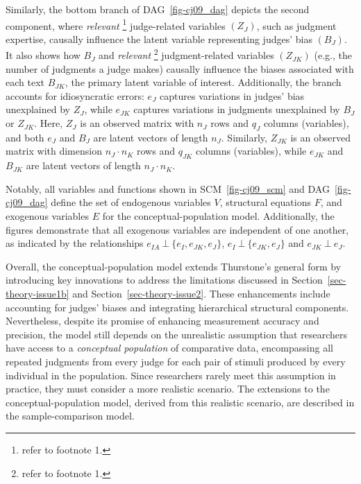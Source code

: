 \documentclass[
  authoryear,
  review,
  1p]{elsarticle}
\begin{document}
Similarly, the bottom branch of DAG~\ref{fig-cj09_dag} depicts the
second component, where \emph{relevant} \footnote{refer to footnote 1.}
judge-related variables \((Z_{J})\), such as judgment expertise,
causally influence the latent variable representing judges' bias
\((B_{J})\). It also shows how \(B_{J}\) and \emph{relevant} \footnote{refer
  to footnote 1.} judgment-related variables \((Z_{JK})\) (e.g., the
number of judgments a judge makes) causally influence the biases
associated with each text \(B_{JK}\), the primary latent variable of
interest. Additionally, the branch accounts for idiosyncratic errors:
\(e_{J}\) captures variations in judges' bias unexplained by \(Z_{J}\),
while \(e_{JK}\) captures variations in judgments unexplained by
\(B_{J}\) or \(Z_{JK}\). Here, \(Z_{J}\) is an observed matrix with
\(n_{J}\) rows and \(q_{J}\) columns (variables), and both \(e_{J}\) and
\(B_{J}\) are latent vectors of length \(n_{J}\). Similarly, \(Z_{JK}\)
is an observed matrix with dimension \(n_{J} \cdot n_{K}\) rows and
\(q_{JK}\) columns (variables), while \(e_{JK}\) and \(B_{JK}\) are
latent vectors of length \(n_{J} \cdot n_{K}\).

Notably, all variables and functions shown in SCM~\ref{fig-cj09_scm} and
DAG~\ref{fig-cj09_dag} define the set of endogenous variables \(V\),
structural equations \(F\), and exogenous variables \(E\) for the
conceptual-population model. Additionally, the figures demonstrate that
all exogenous variables are independent of one another, as indicated by
the relationships \(e_{IA} \:\bot\:\{ e_{I}, e_{JK}, e_{J} \}\),
\(e_{I} \:\bot\:\{ e_{JK}, e_{J} \}\) and \(e_{JK} \:\bot\:e_{J}\).

Overall, the conceptual-population model extends Thurstone's general
form by introducing key innovations to address the limitations discussed
in Section~\ref{sec-theory-issue1b} and Section~\ref{sec-theory-issue2}.
These enhancements include accounting for judges' biases and integrating
hierarchical structural components. Nevertheless, despite its promise of
enhancing measurement accuracy and precision, the model still depends on
the unrealistic assumption that researchers have access to a
\emph{conceptual population} of comparative data, encompassing all
repeated judgments from every judge for each pair of stimuli produced by
every individual in the population. Since researchers rarely meet this
assumption in practice, they must consider a more realistic scenario.
The extensions to the conceptual-population model, derived from this
realistic scenario, are described in the sample-comparison model.
\end{document}
